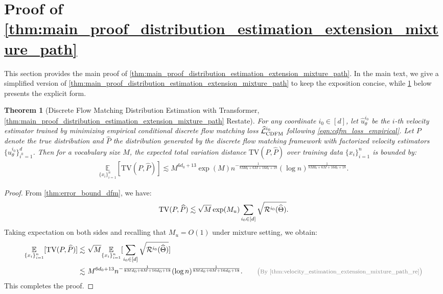 \documentclass[12pt]{article}
\numberwithin{equation}{section}
\let\hat\widehat
\newcommand{\wh}{\widehat}
\renewcommand{\hat}{\wh}
\DeclareMathOperator*{\E}{{\mathbb{E}}}
\def\E{\mathbb{E}}
\theoremstyle{theoremstyle}
\newtheorem{theorem}{Theorem}[section]
\numberwithin{equation}{section}
\numberwithin{theorem}{section}
\numberwithin{proposition}{section}
\numberwithin{definition}{section}
\numberwithin{lemma}{section}
\numberwithin{assumption}{section}
\numberwithin{remark}{section}
\newcommand*{\annot}[1]{\tag*{\footnotesize{\textcolor{black!50}{\big(#1\big)}}}}
\begin{document}
\clearpage






\section{\texorpdfstring{Proof of \cref{thm:main_proof_distribution_estimation_extension_mixture_path}}{Proof of Theorem \ref{thm:main_proof_distribution_estimation_extension_mixture_path}}}
\label{sec:proof_dfm_distribution_esti_mp}

This section provides the main proof of \cref{thm:main_proof_distribution_estimation_extension_mixture_path}.
In the main text, we give a simplified version of \cref{thm:main_proof_distribution_estimation_extension_mixture_path} to keep the exposition concise, while \cref{thm:main_proof_distribution_estimation_extension_mixture_path_re} below presents the explicit form. 


\begin{theorem}[Discrete Flow Matching Distribution Estimation with Transformer, \cref{thm:main_proof_distribution_estimation_extension_mixture_path} Restate]
\label{thm:main_proof_distribution_estimation_extension_mixture_path_re}
For any coordinate $i_0\in[d]$, let $\hat{u}^{i_0}_\theta$  be the $i$-th velocity estimator trained by minimizing empirical conditional discrete flow matching loss $\hat{\mathcal{L}}^{i_0}_{\rm CDFM}$ following \eqref{eqn:cdfm_loss_empirical}.
Let $P$ denote the true distribution and $\hat{P}$ the distribution generated by the discrete flow matching framework with factorized velocity estimators $\{\hat{u}^{i_0}_\theta\}_{i^0=1}^d$.
Then for a vocabulary size $M$, the expected total variation distance $\text{TV}(P,\hat{P})$ over training data $\{x_i\}_{i=1}^n$ is bounded by:
\begin{align*}
    \underset{\{x_i\}_{i=1}^n}{\E}[\text{TV}(P,\hat{P})]\lesssim M^{6d_0+13}\exp(M)n^{-\frac{ 1}{8Md_0+6M+16d_0+18}}(\log n)^{\frac{1}{8Md_0+6M+16d_0+18}}.
\end{align*}
\end{theorem}

\begin{proof}
From \cref{thm:error_bound_dfm}, we have:
\begin{align*}
    {\rm TV}(P,\hat{P})
    \lesssim 
    \sqrt{M} \exp(M_u) 
    \sum_{i_0 \in [d]} \sqrt{\mathcal{R}^{i_0}(\hat{\Theta})}.
\end{align*}
Taking expectation on both sides and recalling that $M_u=O(1)$ under mixture setting, we obtain:
\begin{align*}
    \underset{\{x_i\}_{i=1}^n}{\E}[\text{TV}(P,\hat{P})]\lesssim & ~
    \sqrt{M}\underset{\{x_i\}_{i=1}^n}{\E}[\sum_{i_0 \in [d]} \sqrt{\mathcal{R}^{i_0}(\hat{\Theta})}] \\
    \lesssim & ~
    M^{6d_0+13}n^{-\frac{ 1}{8Md_0+6M+16d_0+18}}(\log n)^{\frac{1}{8Md_0+6M+16d_0+18}}. \annot{By \cref{thm:velocity_estimation_extension_mixture_path_re}}
\end{align*}
This completes the proof.
\end{proof}
\end{document}
